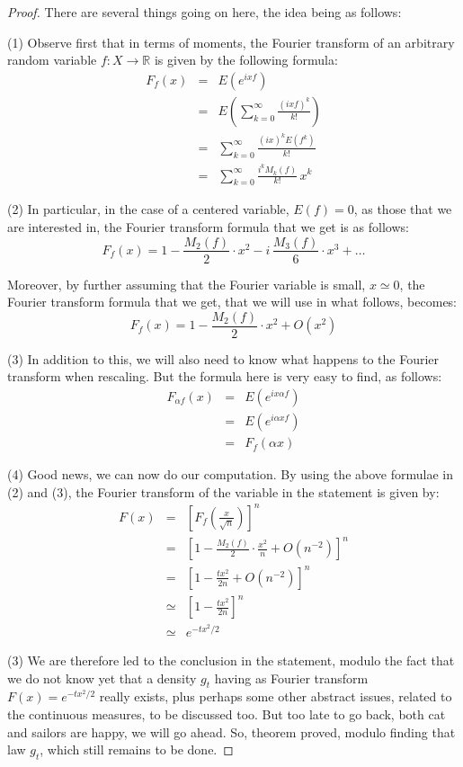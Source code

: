 \documentclass[12pt]{amsbook}
\begin{document}
\begin{proof}
There are several things going on here, the idea being as follows:

\medskip

(1) Observe first that in terms of moments, the Fourier transform of an arbitrary random variable $f:X\to\mathbb R$ is given by the following formula:
\begin{eqnarray*}
F_f(x)
&=&E(e^{ixf})\\
&=&E\left(\sum_{k=0}^\infty\frac{(ixf)^k}{k!}\right)\\
&=&\sum_{k=0}^\infty\frac{(ix)^kE(f^k)}{k!}\\
&=&\sum_{k=0}^\infty\frac{i^kM_k(f)}{k!}\,x^k
\end{eqnarray*}

(2) In particular, in the case of a centered variable, $E(f)=0$, as those that we are interested in, the Fourier transform formula that we get is as follows:
$$F_f(x)=1-\frac{M_2(f)}{2}\cdot x^2-i\,\frac{M_3(f)}{6}\cdot x^3+\ldots$$

Moreover, by further assuming that the Fourier variable is small, $x\simeq0$, the Fourier transform formula that we get, that we will use in what follows, becomes:
$$F_f(x)=1-\frac{M_2(f)}{2}\cdot x^2+O(x^2)$$

(3) In addition to this, we will also need to know what happens to the Fourier transform when rescaling. But the formula here is very easy to find, as follows:
\begin{eqnarray*}
F_{\alpha f}(x)
&=&E(e^{ix\alpha f})\\
&=&E(e^{i\alpha xf})\\
&=&F_f(\alpha x)
\end{eqnarray*}

(4) Good news, we can now do our computation. By using the above formulae in (2) and (3), the Fourier transform of the variable in the statement is given by:
\begin{eqnarray*}
F(x)
&=&\left[F_f\left(\frac{x}{\sqrt{n}}\right)\right]^n\\
&=&\left[1-\frac{M_2(f)}{2}\cdot\frac{x^2}{n}+O(n^{-2})\right]^n\\
&=&\left[1-\frac{tx^2}{2n}+O(n^{-2})\right]^n\\
&\simeq&\left[1-\frac{tx^2}{2n}\right]^n\\
&\simeq&e^{-tx^2/2}
\end{eqnarray*}

(3) We are therefore led to the conclusion in the statement, modulo the fact that we do not know yet that a density $g_t$ having as Fourier transform $F(x)=e^{-tx^2/2}$ really exists, plus perhaps some other abstract issues, related to the continuous measures, to be discussed too. But too late to go back, both cat and sailors are happy, we will go ahead. So, theorem proved, modulo finding that law $g_t$, which still remains to be done.
\end{proof}
\end{document}
